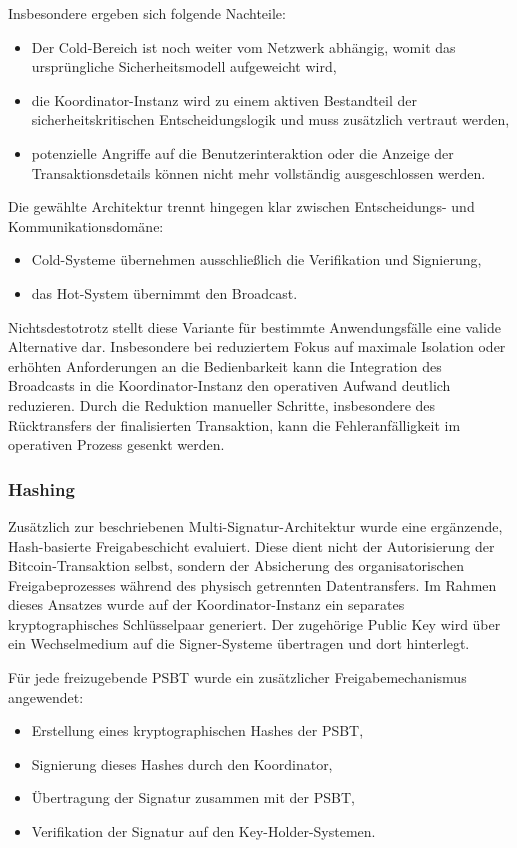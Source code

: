 Insbesondere ergeben sich folgende Nachteile:
\begin{itemize}
    \item Der Cold-Bereich ist noch weiter vom Netzwerk abhängig, womit das ursprüngliche Sicherheitsmodell aufgeweicht wird,
    \item die Koordinator-Instanz wird zu einem aktiven Bestandteil der sicherheitskritischen Entscheidungslogik und muss zusätzlich vertraut werden,
    \item potenzielle Angriffe auf die Benutzerinteraktion oder die Anzeige der Transaktionsdetails können nicht mehr vollständig ausgeschlossen werden.
\end{itemize}

Die gewählte Architektur trennt hingegen klar zwischen Entscheidungs- und Kommunikationsdomäne:
\begin{itemize}
    \item Cold-Systeme übernehmen ausschließlich die Verifikation und Signierung,
    \item das Hot-System übernimmt den Broadcast.
\end{itemize}

Nichtsdestotrotz stellt diese Variante für bestimmte Anwendungsfälle eine valide Alternative dar.
Insbesondere bei reduziertem Fokus auf maximale Isolation oder erhöhten Anforderungen an die Bedienbarkeit kann die Integration des Broadcasts in die Koordinator-Instanz den operativen Aufwand deutlich reduzieren. Durch die Reduktion manueller Schritte, insbesondere des Rücktransfers der finalisierten Transaktion, kann die Fehleranfälligkeit im operativen Prozess gesenkt werden.

\subsubsection{Hashing} \label{sec:alt_hash}
Zusätzlich zur beschriebenen Multi-Signatur-Architektur wurde eine ergänzende, Hash-basierte Freigabeschicht evaluiert. Diese dient nicht der Autorisierung der Bitcoin-Transaktion selbst, sondern der Absicherung des organisatorischen Freigabeprozesses während des physisch getrennten Datentransfers.
Im Rahmen dieses Ansatzes wurde auf der Koordinator-Instanz ein separates kryptographisches Schlüsselpaar generiert. Der zugehörige Public Key wird über ein Wechselmedium auf die Signer-Systeme übertragen und dort hinterlegt.

Für jede freizugebende \ac{PSBT} wurde ein zusätzlicher Freigabemechanismus angewendet:
\begin{itemize}
    \item Erstellung eines kryptographischen Hashes der \ac{PSBT},
    \item Signierung dieses Hashes durch den Koordinator,
    \item Übertragung der Signatur zusammen mit der \ac{PSBT},
    \item Verifikation der Signatur auf den Key-Holder-Systemen.
\end{itemize}

